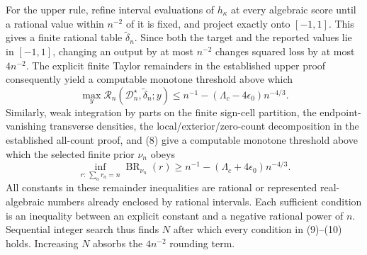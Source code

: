 For the upper rule, refine interval evaluations of \(h_\kappa\) at every algebraic score until a rational value within \(n^{-2}\) of it is fixed, and project exactly onto \([-1,1]\).  This gives a finite rational table \(\widetilde\delta_n\).  Since both the target and the reported values lie in \([-1,1]\), changing an output by at most \(n^{-2}\) changes squared loss by at most \(4n^{-2}\).  The explicit finite Taylor remainders in the established upper proof consequently yield a computable monotone threshold above which
\[
\max_y\mathcal R_n(\mathcal D_n^\star,\widetilde\delta_n;y)
\le n^{-1}-(\Lambda_c-4\epsilon_0)n^{-4/3}.
\tag{9}
\]
Similarly, weak integration by parts on the finite sign-cell partition, the endpoint-vanishing transverse densities, the local/exterior/zero-count decomposition in the established all-count proof, and (8) give a computable monotone threshold above which the selected finite prior \(\nu_n\) obeys
\[
\inf_{r:\,\sum_ar_a=n}\operatorname{BR}_{\nu_n}(r)
\ge n^{-1}-(\Lambda_c+4\epsilon_0)n^{-4/3}.
\tag{10}
\]
All constants in these remainder inequalities are rational or represented real-algebraic numbers already enclosed by rational intervals.  Each sufficient condition is an inequality between an explicit constant and a negative rational power of \(n\).  Sequential integer search thus finds \(N\) after which every condition in (9)--(10) holds.  Increasing \(N\) absorbs the \(4n^{-2}\) rounding term.

